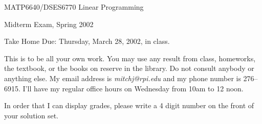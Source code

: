 \documentclass[12pt]{article}
\begin{document}
\begin{center}
  \begin{large}
     MATP6640/DSES6770 Linear Programming
  \end{large}
\end{center}
\begin{center}
  \begin{large}
                Midterm Exam, Spring 2002
  \end{large}
\end{center}

Take Home   \hfill    Due:  Thursday, March 28, 2002, in class.

\vspace{\baselineskip}

This is to be all your own work.  You may use any result from class,
homeworks, the textbook, or the books on reserve in the library.
Do not consult anybody or anything else. 
My email address is {\em mitchj@rpi.edu} and
my phone number is 276--6915.
I'll have my regular office hours on Wednesday from 10am to 12 noon.

In order that I can display grades, please write a 4 digit number
on the front of your solution set.
\end{document}
